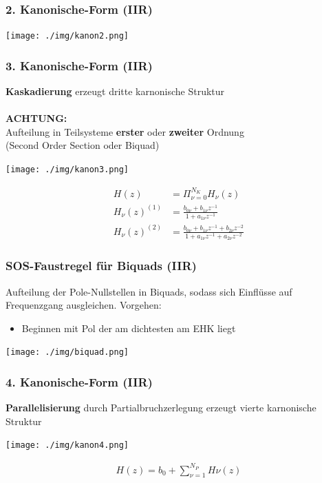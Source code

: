 \documentclass[10pt,a4paper]{article}
\begin{document}
\subsubsection{2. Kanonische-Form (IIR)}
  \begin{center}
      \texttt{[image: ./img/kanon2.png]}
  \end{center}
\subsubsection{3. Kanonische-Form (IIR)}
\textbf{Kaskadierung} erzeugt dritte karnonische Struktur\\\\
\textbf{ACHTUNG: } \\
Aufteilung in Teilsysteme \textbf{erster} oder \textbf{zweiter} Ordnung\\
 (\grqq{}Second Order Section\grqq{} oder \grqq{}Biquad\grqq{})
  \begin{center}
      \texttt{[image: ./img/kanon3.png]}
  \end{center}
  \begin{mdframed}[style=exercise]
    \begin{align}
        H(z)&=\Pi_{\nu=0}^{N_K} H_\nu(z)\\
        H_\nu(z)^{(1)}&=\frac{b_{0\nu}+b_{1\nu}z^{-1}}{1+a_{1\nu}z^{-1}}\\
        H_\nu(z)^{(2)}&=\frac{b_{0\nu}+b_{1\nu}z^{-1}+b_{2\nu}z^{-2}}{1+a_{1\nu}z^{-1}+a_{2\nu}z^{-2}}
    \end{align}
  \end{mdframed}
  \subsubsection{SOS-Faustregel für Biquads (IIR)}
  Aufteilung der Pole-Nullstellen in Biquads, sodass sich Einflüsse auf Frequenzgang ausgleichen.
  Vorgehen:
  \begin{itemize}
      \item Beginnen mit Pol der am dichtesten am EHK liegt
  \end{itemize}
    \begin{center}
        \texttt{[image: ./img/biquad.png]}
    \end{center}
\begin{minipage}{0.5\textwidth}   
\subsubsection{4. Kanonische-Form (IIR)}
\textbf{Parallelisierung} durch Partialbruchzerlegung erzeugt vierte karnonische Struktur\\
  \begin{center}
      \texttt{[image: ./img/kanon4.png]}
  \end{center}
  \begin{mdframed}[style=exercise]
    \begin{align}
        H(z)=b_0+\sum_{\nu=1}^{N_P}H\nu(z)
    \end{align}
  \end{mdframed}
\end{minipage}
\end{document}
